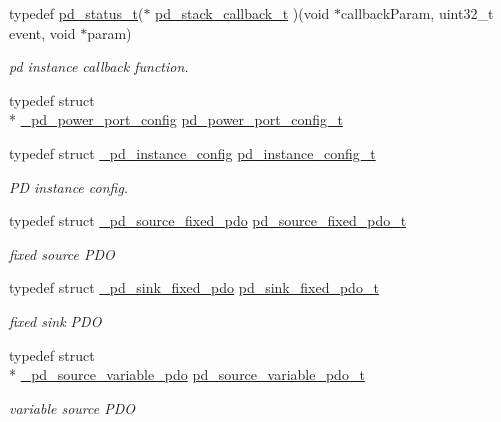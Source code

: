 \begin{DoxyCompactItemize}
typedef \hyperlink{group__usb__pd__stack_ga04a1f331d9807a70ab9bb753f5ed1c80}{pd\-\_\-status\-\_\-t}($\ast$ \hyperlink{group__usb__pd__stack_ga270b6a571db4fa308a1cce3df32f5439}{pd\-\_\-stack\-\_\-callback\-\_\-t} )(void $\ast$callback\-Param, uint32\-\_\-t event, void $\ast$param)
\begin{DoxyCompactList}\small\item\em pd instance callback function. \end{DoxyCompactList}\item 
typedef struct \\*
\hyperlink{struct__pd__power__port__config}{\-\_\-pd\-\_\-power\-\_\-port\-\_\-config} \hyperlink{group__usb__pd__stack_ga1897a14a90aea9e4b0e7cf1e5b4ea449}{pd\-\_\-power\-\_\-port\-\_\-config\-\_\-t}
\item 
typedef struct \hyperlink{struct__pd__instance__config}{\-\_\-pd\-\_\-instance\-\_\-config} \hyperlink{group__usb__pd__stack_gafa6034f9e204836697da1f2fc996cbad}{pd\-\_\-instance\-\_\-config\-\_\-t}
\begin{DoxyCompactList}\small\item\em P\-D instance config. \end{DoxyCompactList}\item 
typedef struct \hyperlink{struct__pd__source__fixed__pdo}{\-\_\-pd\-\_\-source\-\_\-fixed\-\_\-pdo} \hyperlink{group__usb__pd__stack_gaa7dd48248cb5b3177c59635a91f1b16e}{pd\-\_\-source\-\_\-fixed\-\_\-pdo\-\_\-t}
\begin{DoxyCompactList}\small\item\em fixed source P\-D\-O \end{DoxyCompactList}\item 
typedef struct \hyperlink{struct__pd__sink__fixed__pdo}{\-\_\-pd\-\_\-sink\-\_\-fixed\-\_\-pdo} \hyperlink{group__usb__pd__stack_gac1092e8fe40315ed926966b5b17883aa}{pd\-\_\-sink\-\_\-fixed\-\_\-pdo\-\_\-t}
\begin{DoxyCompactList}\small\item\em fixed sink P\-D\-O \end{DoxyCompactList}\item 
typedef struct \\*
\hyperlink{struct__pd__source__variable__pdo}{\-\_\-pd\-\_\-source\-\_\-variable\-\_\-pdo} \hyperlink{group__usb__pd__stack_ga0c9d6847951d8b95ecfac843574c027d}{pd\-\_\-source\-\_\-variable\-\_\-pdo\-\_\-t}
\begin{DoxyCompactList}\small\item\em variable source P\-D\-O \end{DoxyCompactList}\item 

\end{DoxyCompactItemize}
